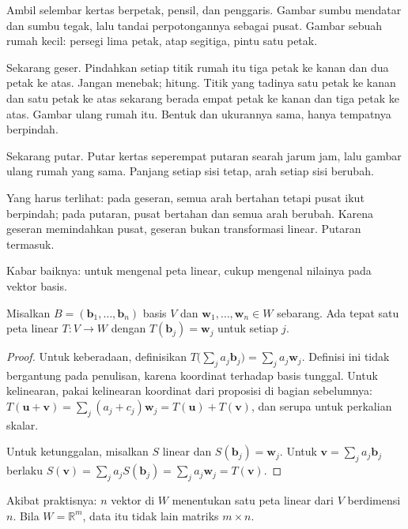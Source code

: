 \begin{tangan}
Ambil selembar kertas berpetak, pensil, dan penggaris. Gambar sumbu mendatar dan sumbu
tegak,
lalu tandai perpotongannya sebagai pusat. Gambar sebuah rumah kecil: persegi lima petak,
atap
segitiga, pintu satu petak.

Sekarang geser. Pindahkan setiap titik rumah itu tiga petak ke kanan dan dua petak ke atas.
Jangan menebak; hitung. Titik yang tadinya satu petak ke kanan dan satu petak ke atas
sekarang
berada empat petak ke kanan dan tiga petak ke atas. Gambar ulang rumah itu. Bentuk dan
ukurannya
sama, hanya tempatnya berpindah.

Sekarang putar. Putar kertas seperempat putaran searah jarum jam, lalu gambar ulang rumah
yang
sama. Panjang setiap sisi tetap, arah setiap sisi berubah.

Yang harus terlihat: pada geseran, semua arah bertahan tetapi pusat ikut berpindah; pada
putaran, pusat bertahan dan semua arah berubah. Karena geseran memindahkan pusat, geseran
bukan
transformasi linear. Putaran termasuk.
\end{tangan}

Kabar baiknya: untuk mengenal peta linear, cukup mengenal nilainya pada vektor basis.

\begin{proposisi}
Misalkan $B=(\mathbf{b}_{1},\dots,\mathbf{b}_{n})$ basis $V$ dan
$\mathbf{w}_{1},\dots,\mathbf{w}_{n}\in W$ sebarang. Ada tepat satu peta linear
$T\colon V\to W$ dengan $T(\mathbf{b}_{j})=\mathbf{w}_{j}$ untuk setiap $j$.
\end{proposisi}

\begin{proof}
Untuk keberadaan, definisikan
$T\bigl(\sum_{j}a_{j}\mathbf{b}_{j}\bigr)=\sum_{j}a_{j}\mathbf{w}_{j}$.
Definisi ini tidak bergantung pada penulisan, karena koordinat terhadap basis tunggal. Untuk
kelinearan, pakai kelinearan koordinat dari proposisi di bagian sebelumnya:
$T(\mathbf{u}+\mathbf{v})=\sum_{j}(a_{j}+c_{j})\mathbf{w}_{j}=T(\mathbf{u})+T(\mathbf{v})$,
dan serupa untuk perkalian skalar.

Untuk ketunggalan, misalkan $S$ linear dan $S(\mathbf{b}_{j})=\mathbf{w}_{j}$. Untuk
$\mathbf{v}=\sum_{j}a_{j}\mathbf{b}_{j}$ berlaku
$S(\mathbf{v})=\sum_{j}a_{j}S(\mathbf{b}_{j})=\sum_{j}a_{j}\mathbf{w}_{j}=T(\mathbf{v})$.
\end{proof}

Akibat praktisnya: $n$ vektor di $W$ menentukan satu peta linear dari $V$ berdimensi $n$.
Bila $W=\mathbb{R}^{m}$, data itu tidak lain matriks $m\times n$.

